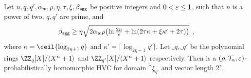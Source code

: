 \begin{lemma}\label{lem:hvcprobhom}
  Let $n,q,q',\alpha_w,\rho,\eta,\tau,\xi,\beta_{\mathsf{agg}}$ be positive integers and $0 < \varepsilon \leq 1$, such that $n$ is a power of two, $q,q'$ are prime,
and
  \[
  \beta_{\mathsf{agg}} \geq \eta\sqrt{2\alpha_w\rho
  \bigl(
  \ln\tfrac{2n}{\varepsilon} +  \ln(2\tau\kappa  + \xi\kappa' + 2\tau)
  \bigr)}\enspace,
  \]
  where $\kappa=\ceil{\log_{2\eta+1}q}$ and $\kappa'=\lceil\log_{2\eta+1}q'\rceil$.
  Let $\ring_q,\ring_{q'}$ be the polynomial rings $\defringq$ and $\defringqq$ respectively.
  Then \eprint{$\hvcplain$}\cameraready{$\hvccamera$} is a $(\rho,\mathcal{T}_\alpha,\varepsilon)$-probabilistically homomorphic HVC for domain $\ring^\xi_{q'}$ and vector length $2^\tau$.
\end{lemma}
